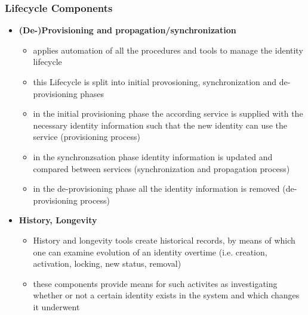 \documentclass[11pt]{article}
\begin{document}
\subsubsection{Lifecycle Components}
\label{sec:orgbf45ae2}
\begin{itemize}
\item \textbf{(De-)Provisioning and propagation/synchronization}
\begin{itemize}
\item applies automation of all the procedures and tools to manage the identity lifecycle
\item this Lifecycle is split into initial provosioning, synchronization and de-provisioning phases
\item in the initial provisioning phase the according service is supplied with the necessary identity information such that the new identity can use the service (provisioning process)
\item in the synchronzsation phase identity information is updated and compared between services (synchronization and propagation process)
\item in the de-provisioning phase all the identity information is removed (de-provisioning process)
\end{itemize}
\item \textbf{History, Longevity}
\begin{itemize}
\item History and longevity tools create historical records, by means of which one can examine evolution of an identity overtime (i.e. creation, activation, locking, new status, removal)
\item these components provide means for such activites as investigating whether or not a certain identity exists in the system and which changes it underwent
\end{itemize}
\end{itemize}
\end{document}
